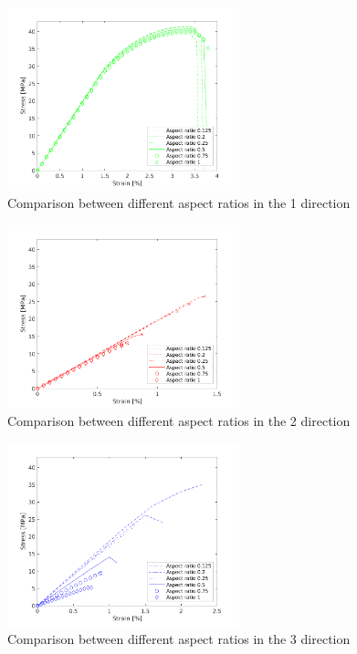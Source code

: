\begin{figure}[H]
    \centering
    \includegraphics[width=0.60\textwidth]{chapter_7_non-elasticmodelling/figures/AR1.png}
    \caption{Comparison between different aspect ratios in the 1 direction}
    \label{fig:AR1}
\end{figure}
\begin{figure}[H]
    \centering
    \includegraphics[width=0.60\textwidth]{chapter_7_non-elasticmodelling/figures/AR2.png}
    \caption{Comparison between different aspect ratios in the 2 direction}
    \label{fig:AR2}
\end{figure}
\begin{figure}[H]
    \centering
    \includegraphics[width=0.60\textwidth]{chapter_7_non-elasticmodelling/figures/AR3.png}
    \caption{Comparison between different aspect ratios in the 3 direction}
    \label{fig:AR3}
\end{figure}

